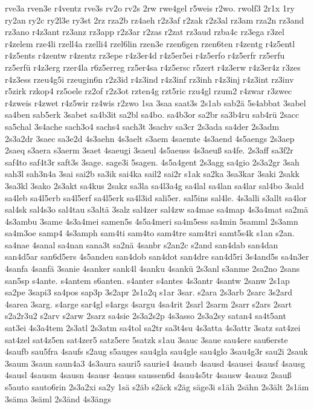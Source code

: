{rve3a
rven3e
r4ventz
rve3s
rv2o
rv2s
2rw
rwe4gel
r5weis
r2wo.
rwolf3
2r1x
1ry
ry2an
ry2c
ry2l3e
ry3st
2rz
rza2b
rz4aeh
r2z3af
r2zak
r2z3al
rz3am
rza2n
rz3and
rz3ano
r4z3ant
rz3anz
rz3app
r2z3ar
r2zas
r2zat
rz3aud
rzba4c
rz3ega
r3zel
r4zelem
rze4li
rzell4a
rzelli4
rzel6lin
rzen3e
rzen6gen
rzen6ten
r4zentg
r4z5entl
r4z5ents
r4zentw
r4zentz
rz3epe
r4z3er4d
r4z5er5ei
r4z5erfo
r4z5erfr
rz5erfu
rz5erfü
r4z3erg
rzer4la
r6z5erreg
rz5er4sa
r4z5ersc
r5zert
r4z3erw
r4z3er4z
r3zes
r4z3ess
rzeu4g5i
rzeugin6n
r2z3id
r4z3ind
r4z3inf
rz3inh
r4z3inj
r4z3int
rz3inv
r5zirk
rzkop4
rz5oele
rz2of
r2z3ot
rzten4g
rzt5ric
rzu4gl
rzum2
r4zwar
r3zwec
r4zweis
r4zwet
r4z5wir
rz4wis
r2zwo
1sa
3saa
saat3s
2s1ab
sab2ä
5s4abbat
3sabel
sa4ben
sab5erk
3sabet
sa4b3it
sa2bl
sa4bo.
sa4b3or
sa2br
sa3b4ru
sab4rü
2sacc
sa5chal
3s4ache
sach3o4
sachs4
sach3t
3sachv
sa3cr
2s3ada
sa4der
2s3adm
2s3a2dr
3saec
sa3e2d
4s3aehn
4s3aelt
s3aem
4saemte
4s3aend
4s5aengs
2s3aep
2saeq
s3aera
s3aerm
3saet
4saeugi
3saeul
4s5aeuss
4s3aeuß
sa4fe.
2s3aff
sa3f2r
saf4to
saf4t3r
saft3s
3sage.
sage3i
5sagen.
4s5a4gent
2s3agg
sa4gio
2s3a2gr
3sah
sah3l
sah3n4a
3sai
sai2b
sa3ik
sai4ka
sail2
sai2r
s1ak
sa2ka
3sa3kar
3saki
2sakk
3sa3kl
3sako
2s3akt
sa4kus
2sakz
sa3la
sa4l3a4g
sa4lal
sa4lan
sa4lar
sal4bo
3sald
sa4leb
sa4l5erb
sa4l5erf
sa4l5erk
sa4l3id
sali5er.
sal5ins
sal4le.
4s3alli
s3allt
sa4lor
sal4sk
sal4s3o
sal4tau
s3altä
3salz
sal4zer
sal4zw
sa4mae
sa4map
4s3a4mat
sa2mä
4s3ambu
3same
4s3a4mei
samen5s
4s5a4meri
sa4m5ess
sa4min
5samml
2s3amn
sa4m3oe
samp4
4s3amph
sam4ti
sam4to
sam4tre
sam4tri
samt5s4k
s1an
s2an.
sa4nae
4sanal
sa4nan
sana3t
sa2nä
4sanbr
s2an2c
s2and
san4dab
san4dan
san4d5ar
san6d5ers
4s5andeu
san4dob
san4dot
san4dre
san4d5ri
3s4and5s
sa4n3er
4sanfa
4sanfä
3sanie
4sanker
sank4l
4sanku
4sankü
2s3anl
s3anme
2sa2no
2sans
san5sp
s4ante.
s4antem
s6anten.
s4anter
s4antes
4s3antr
4santw
2sanw
2s1ap
sa2pe
3sapi3
sa4pos
sap3p
3s2apr
2s1a2q
s1ar
3sar.
s2ara
2s3arb
2sarc
3s2ard
4sarea
3sarg.
s4arge
sar4gl
s4args
4sargu
4sa4rit
2sarl
2sarm
2sarr
s2ars
2sart
s2a2r3u2
s2arv
s2arw
2sarz
sa4sie
2s3a2s2p
4s3asso
2s3a2sy
satan4
sa4t5ant
sat3ei
4s3a4tem
2s3atl
2s3atm
sa4tol
sa2tr
sa3t4su
4s3atta
4s3attr
3satz
sat4zei
sat4zel
sat4z5en
sat4zer5
satz5ere
5satzk
s1au
3sauc
3saue
sau4ere
sau6erste
4saufb
sau5fra
4saufs
s2aug
s5auges
sau4gla
sau4gle
sau4glo
3sau4g3r
sau2i
2sauk
3saum
3saun
saun4a3
4s3aura
sauri5
saurie4
4sausb
4sausd
4sausei
4sausf
4sausg
4sausl
4sausm
4sausn
4sausr
4sauss
saussen6d
4sau4s5tr
4sausw
4sausz
2sauß
s5auto
sauto6rin
2s3a2xi
sa2y
1sä
s2äb
s2äck
s2äg
säge3i
s1äh
2sähn
2s3ält
2s1äm
3säma
3säml
2s3änd
4s3ängs
}
